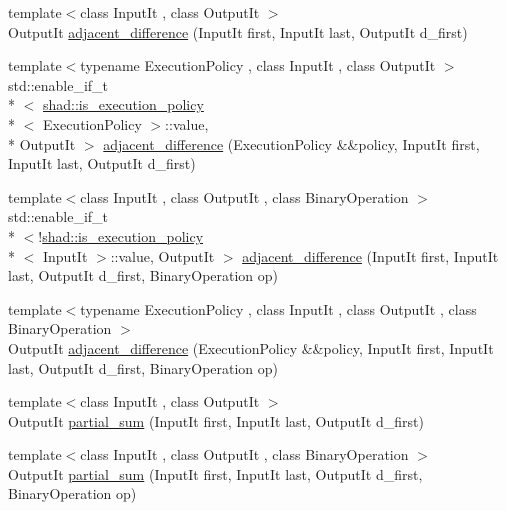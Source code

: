 \begin{DoxyCompactItemize}
\item 
{\footnotesize template$<$class Input\-It , class Output\-It $>$ }\\Output\-It \hyperlink{namespaceshad_a740dc92192ebb80d0651a62c31ad92ec}{adjacent\-\_\-difference} (Input\-It first, Input\-It last, Output\-It d\-\_\-first)
\item 
{\footnotesize template$<$typename Execution\-Policy , class Input\-It , class Output\-It $>$ }\\std\-::enable\-\_\-if\-\_\-t\\*
$<$ \hyperlink{structshad_1_1is__execution__policy}{shad\-::is\-\_\-execution\-\_\-policy}\\*
$<$ Execution\-Policy $>$\-::value, \\*
Output\-It $>$ \hyperlink{namespaceshad_affad70e4283f19271fe3ab0ea3ce1b90}{adjacent\-\_\-difference} (Execution\-Policy \&\&policy, Input\-It first, Input\-It last, Output\-It d\-\_\-first)
\item 
{\footnotesize template$<$class Input\-It , class Output\-It , class Binary\-Operation $>$ }\\std\-::enable\-\_\-if\-\_\-t\\*
$<$!\hyperlink{structshad_1_1is__execution__policy}{shad\-::is\-\_\-execution\-\_\-policy}\\*
$<$ Input\-It $>$\-::value, Output\-It $>$ \hyperlink{namespaceshad_ac72a7771f9b490b5948c84da221e9a83}{adjacent\-\_\-difference} (Input\-It first, Input\-It last, Output\-It d\-\_\-first, Binary\-Operation op)
\item 
{\footnotesize template$<$typename Execution\-Policy , class Input\-It , class Output\-It , class Binary\-Operation $>$ }\\Output\-It \hyperlink{namespaceshad_a390a66f6af57d674bfcd5aced6b69a9d}{adjacent\-\_\-difference} (Execution\-Policy \&\&policy, Input\-It first, Input\-It last, Output\-It d\-\_\-first, Binary\-Operation op)
\item 
{\footnotesize template$<$class Input\-It , class Output\-It $>$ }\\Output\-It \hyperlink{namespaceshad_a08d8882161e132a6fb3f9253b9a3bdef}{partial\-\_\-sum} (Input\-It first, Input\-It last, Output\-It d\-\_\-first)
\item 
{\footnotesize template$<$class Input\-It , class Output\-It , class Binary\-Operation $>$ }\\Output\-It \hyperlink{namespaceshad_a82089f3b0373f5062395613e51d16fa3}{partial\-\_\-sum} (Input\-It first, Input\-It last, Output\-It d\-\_\-first, Binary\-Operation op)

\end{DoxyCompactItemize}
